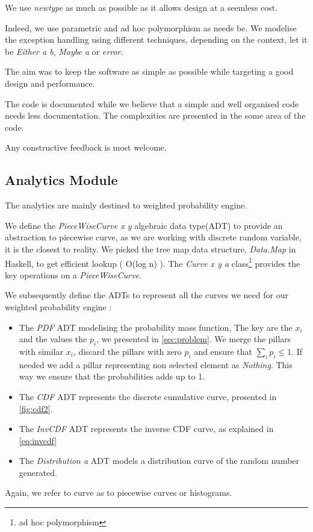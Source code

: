 \documentclass[12pt,a4paper,article]{memoir} %
\begin{document}
We use \emph{newtype} as much as possible as it allows design at a 
seemless cost.

Indeed, we use parametric and ad hoc polymorphism as needs be.
We modelise the exception handling using different techniques, depending on
the context, let it be \emph{Either a b}, \emph{Maybe a} or \emph{error}. 

The aim was to keep the software as simple as possible while targeting a
good design and performance. 

The code is documented while we believe that a simple and well organised
code needs less documentation. The complexities are presented in the some
area of the code. 

Any constructive feedback is most welcome.

\subsection{Analytics Module}

The analytics are mainly destined to weighted probability engine.

We define the \emph{PieceWiseCurve x y} algebraic data type(ADT) to provide an
abstraction to piecewise curve, as we are working with discrete
random variable, it is the closest to reality. We picked the tree map data
structure, \emph{Data.Map} in Haskell, to get efficient lookup ( O(log n) ).
The \emph{Curve x y a} class\footnote{ad hoc polymorphism} 
provides the key operations on a 
\emph{PieceWiseCurve}.  

We subsequently define the ADTs to represent all the curves we need
for our weighted probability engine :
\begin{itemize}
	\item The \emph{PDF} ADT modelising the probability mass function,
	The key are the $x_i$ and the values the $p_i$, we presented in
	\autoref{sec:problem}.
	We merge the pillars with similar $x_i$, discard the pillars with zero
	$p_i$ and ensure that $\sum_i p_i \leq 1$.
	If needed we add a pillar representing non selected element 
	as \emph{Nothing}. This way we ensure that the probabilities
	adds up to 1.
	\item The \emph{CDF} ADT represents the discrete cumulative
	curve, presented in \autoref{fig:cdf2}.
	\item The \emph{InvCDF} ADT represents the inverse CDF curve,
	as explained in \autoref{eq:invcdf}
	\item The \emph{Distribution a} ADT models a distribution curve
	of the random number generated.
\end{itemize}
Again, we refer to curve as to piecewise curves or histograms.
\end{document}
